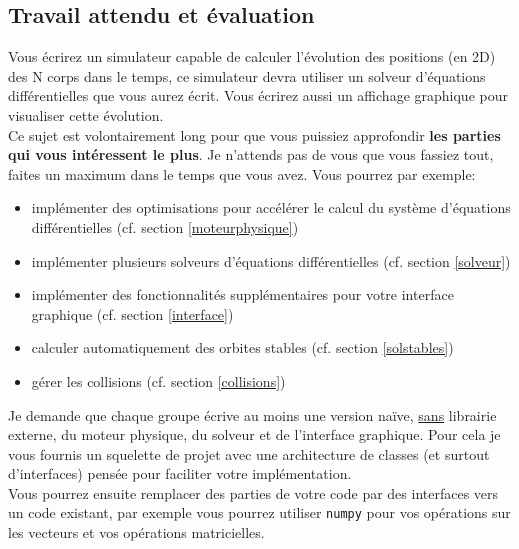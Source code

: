 \documentclass{article}
\begin{document}
\subsection{Travail attendu et évaluation}

Vous écrirez un simulateur capable de calculer l'évolution des positions (en 2D) des N corps dans le temps, ce simulateur devra utiliser un solveur d'équations différentielles que vous aurez écrit. Vous écrirez aussi un affichage graphique pour visualiser cette évolution. \\
Ce sujet est volontairement long pour que vous puissiez approfondir \textbf{les parties qui vous intéressent le plus}. Je n'attends pas de vous que vous fassiez tout, faites un maximum dans le temps que vous avez. Vous pourrez par exemple:
\begin{itemize}
    \item implémenter des optimisations pour accélérer le calcul du système d'équations différentielles (cf. section \ref{moteurphysique})
    \item implémenter plusieurs solveurs d'équations différentielles (cf. section \ref{solveur})
    \item implémenter des fonctionnalités supplémentaires pour votre interface graphique (cf. section \ref{interface})
    \item calculer automatiquement des orbites stables (cf. section \ref{solstables})
    \item gérer les collisions (cf. section \ref{collisions})
\end{itemize}
Je demande que chaque groupe écrive au moins une version naïve, \underline{sans} librairie externe, du moteur physique, du solveur et de l'interface graphique. Pour cela je vous fournis un squelette de projet avec une architecture de classes (et surtout d'interfaces) pensée pour faciliter votre implémentation.\\
Vous pourrez ensuite remplacer des parties de votre code par des interfaces vers un code existant, par exemple vous pourrez utiliser \verb!numpy! pour vos opérations sur les vecteurs et vos opérations matricielles. \\

\vspace{1em}
\end{document}

